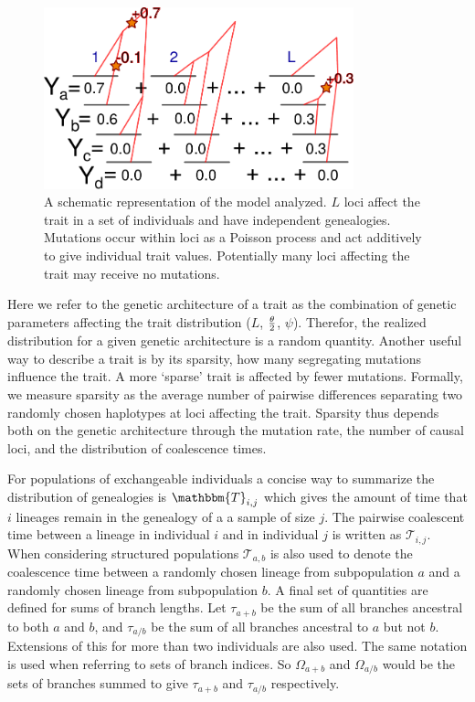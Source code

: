 \begin{figure}
  \centering
  \includegraphics[width=0.8\textwidth]{figures/schema.pdf}
  \caption{A schematic representation of the model analyzed.
  $L$ loci affect the trait in a set of individuals and have independent
  genealogies. Mutations occur within loci as a Poisson process and act
  additively to give individual trait values. Potentially many loci affecting
  the trait may receive no mutations.}
  \label{fig:schema}
\end{figure}

Here we refer to the genetic architecture of a trait as the combination of
genetic parameters affecting the trait distribution ($L$, $\frac{\theta}{2}$, $\psi$).
Therefor, the realized distribution for a given genetic architecture is a random
quantity. Another useful way to describe a trait is by its sparsity, how many
segregating mutations influence the trait. A more `sparse' trait is affected by
fewer mutations. Formally, we measure sparsity as the average number of pairwise
differences separating two randomly chosen haplotypes at loci affecting the
trait. Sparsity thus depends both on the genetic architecture through the
mutation rate, the number of causal loci, and the distribution of coalescence
times.

For populations of exchangeable individuals a concise way to summarize the
distribution of genealogies is $\mathbbm{T}_{i,j}$ which gives the amount of
time that $i$ lineages remain in the genealogy of a a sample of size $j$. The
pairwise coalescent time between a lineage in individual $i$ and in individual
$j$ is written as $\mathcal{T}_{i,j}$. When considering structured populations
$\mathcal{T}_{a,b}$ is also used to denote the coalescence time between a
randomly chosen lineage from subpopulation $a$ and a randomly chosen lineage
from subpopulation $b$. A final set of quantities are defined for sums of branch
lengths. Let $\tau_{a+b}$ be the sum of all branches ancestral to both $a$ and
$b$, and $\tau_{a/b}$ be the sum of all branches ancestral to $a$ but not $b$.
Extensions of this for more than two individuals are also used. The same
notation is used when referring to sets of branch indices. So $\Omega_{a+b}$ and
$\Omega_{a/b}$ would be the sets of branches summed to give $\tau_{a+b}$ and
$\tau_{a/b}$ respectively.

